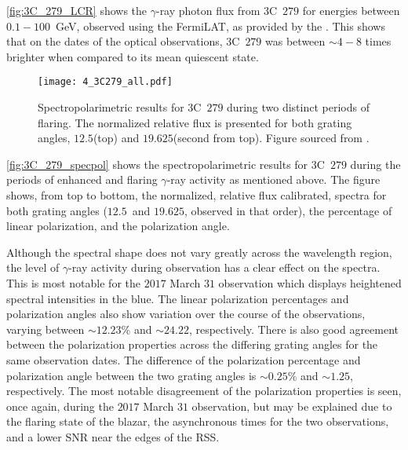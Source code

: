\autoref{fig:3C_279_LCR} shows the $\gamma$-ray photon flux from 3C~$279$ for energies between $0.1 - 100$~GeV, observed using the \gls{FermiLAT}, as provided by the  \citep{FermiLCR}.
This shows that on the dates of the optical observations, 3C~$279$ was between $\sim4 - 8$ times brighter when compared to its mean quiescent state. 

\begin{figure}[t]
    \centering
    \texttt{[image: 4\_3C279\_all.pdf]}
    \caption{Spectropolarimetric results for 3C~$279$ during two distinct periods of flaring. The normalized relative flux is presented for both grating angles, $12.5$\degree (top) and $19.625$\degree (second from top). Figure sourced from \citep{Cooper_HEASA2022}.}
    \label{fig:3C_279_specpol}
\end{figure}

\autoref{fig:3C_279_specpol} shows the spectropolarimetric results for 3C~$279$ during the periods of enhanced and flaring $\gamma$-ray activity as mentioned above.
The figure shows, from top to bottom, the normalized, relative flux calibrated, spectra for both grating angles ($12.5$\degree\ and $19.625$\degree, observed in that order), the percentage of linear polarization, and the polarization angle.

Although the spectral shape does not vary greatly across the wavelength region, the level of $\gamma$-ray activity during observation has a clear effect on the spectra.
This is most notable for the $2017$ March $31$ observation which displays heightened spectral intensities in the blue.
The linear polarization percentages and polarization angles also show variation over the course of the observations, varying between $\sim 12.23\%$ and $\sim 24.22$\degree, respectively.
There is also good agreement between the polarization properties across the differing grating angles for the same observation dates.
The difference of the polarization percentage and polarization angle between the two grating angles is $\sim 0.25\%$ and $\sim 1.25$\degree, respectively.
The most notable disagreement of the polarization properties is seen, once again, during the $2017$ March $31$ observation, but may be explained due to the flaring state of the blazar, the asynchronous times for the two observations, and a lower \gls{SNR} near the edges of the \gls{RSS}.

